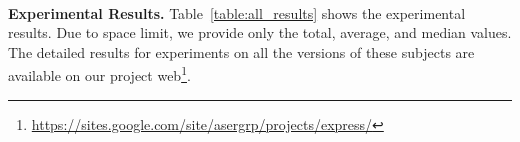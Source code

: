 %
\\ \textbf{Experimental Results.} 
Table~\ref{table:all_results} shows the experimental results. Due to space limit, we provide only  the total, average, and median values.
The detailed results for experiments on all the versions of these subjects are available on our project web\footnote{\scriptsize\url{https://sites.google.com/site/asergrp/projects/express/}}.

